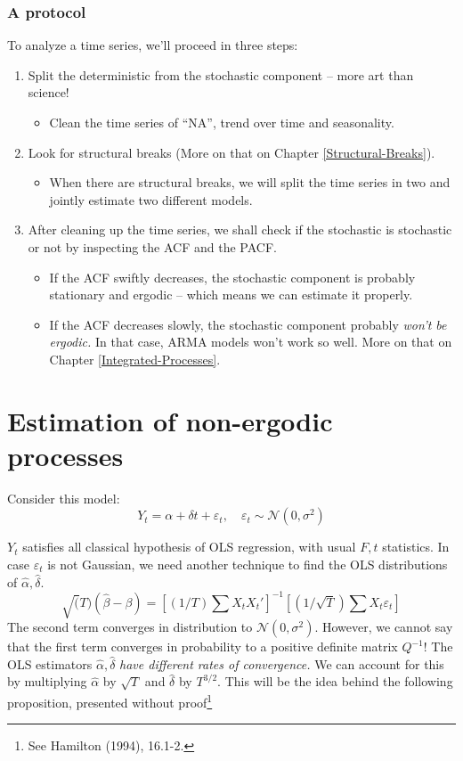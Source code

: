 \documentclass[11pt, a4paper]{report}
\theoremstyle{plain}
\theoremstyle{plain}
\theoremstyle{remark}
\begin{document}
\subsubsection{A protocol}

To analyze a time series, we'll proceed in three steps:
\begin{enumerate}
	\item Split the deterministic from the stochastic component -- more art than science! \begin{itemize}
		\item Clean the time series of ``NA'', trend over time and seasonality.
	\end{itemize}
	\item Look for structural breaks (More on that on Chapter \ref{Structural-Breaks}). \begin{itemize}
		\item When there are structural breaks, we will split the time series in two and jointly estimate two different models.
	\end{itemize}
	\item After cleaning up the time series, we shall check if the stochastic is stochastic or not by inspecting the ACF and the PACF. 
	\begin{itemize}
		\item If the ACF swiftly decreases, the stochastic component is probably stationary and ergodic -- which means we can estimate it properly.
		\item If the ACF decreases slowly, the stochastic component probably \textit{won't be ergodic.} In that case, ARMA models won't work so well. More on that on Chapter \ref{Integrated-Processes}.
	\end{itemize}
\end{enumerate}


\section{Estimation of non-ergodic processes} %

Consider this model:
$$ Y_t = \alpha + \delta t + \varepsilon_t, \hspace{1em} \varepsilon_t \sim \mathcal{N}(0, \sigma^2)$$

$Y_t$ satisfies all classical hypothesis of OLS regression, with usual $F, t$ statistics. In case $\varepsilon_t$ is not Gaussian, we need another technique to find the OLS distributions of $\hat{\alpha}, \hat{\delta}$.
$$ \sqrt(T)(\hat{\beta} - \beta) = [(1/T) \sum X_t X_t']^{-1} [(1/\sqrt{T}) \sum X_t \varepsilon_t] $$
The second term converges in distribution to $\mathcal{N}(0, \sigma^2)$. However, we cannot say that the first term converges in probability to a positive definite matrix $Q^{-1}$! The OLS estimators $\hat{\alpha}, \hat{\delta}$ \textit{have different rates of convergence.} We can account for this by multiplying $\hat{\alpha}$ by $\sqrt{T}$ and $\hat{\delta}$ by $T^{3/2}$. This will be the idea behind the following proposition, presented without proof\footnote{See Hamilton (1994), 16.1-2.}
\end{document}
